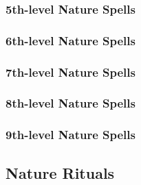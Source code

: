 \subsubsection{5th-level Nature Spells}
\begin{spelllist}
    \SLcurelightwoundsmass
    \SLfogshield
    \SLsummonnaturesallyv
    \SLtotemicmindgreater
    \SLtotemicpowergreater
    \SLwalloffiregreater
    \SLwindstrikegreater
\end{spelllist}

\subsubsection{6th-level Nature Spells}
\begin{spelllist}
    \SLchainlightning
    \SLcuremoderatewoundsmass
    \SLdispelmagicgreater
    \SLfireseeds
    \SLheal
    \SLskysmite
    \SLsolidfog
    \SLstormlord
    \SLsummonnaturesallyvi
    \SLsunburst
    \SLwallofthornsgreater
\end{spelllist}

\subsubsection{7th-level Nature Spells}
\begin{spelllist}
    \SLantilifeshell
    \SLconeofcoldgreater
    \SLcureseriouswoundsmass
    \SLfogsea
    \SLfreedommass
    \SLregeneration
    \SLsummonnaturesallyvii
\end{spelllist}

\subsubsection{8th-level Nature Spells}
\begin{spelllist}
    \SLcalllightninggreater
    \SLcurecriticalwoundsmass
    \SLearthquake
    \SLfirestorm
    \SLsummonnaturesallyviii
    \SLsummonnaturesarmy
\end{spelllist}

\subsubsection{9th-level Nature Spells}
\begin{spelllist}
    \SLstormofvengeance
\end{spelllist}

\subsection{Nature Rituals}\label{Nature Rituals}

